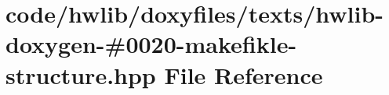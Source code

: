 \hypertarget{hwlib-doxygen-#0020-makefikle-structure_8hpp}{}\section{code/hwlib/doxyfiles/texts/hwlib-\/doxygen-\/\#0020-\/makefikle-\/structure.hpp File Reference}
\label{hwlib-doxygen-#0020-makefikle-structure_8hpp}
